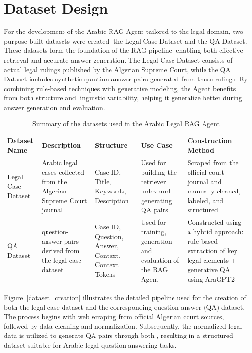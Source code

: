 \section{Dataset Design}
For the development of the Arabic RAG Agent tailored to the legal domain, two purpose-built datasets were created: the Legal Case Dataset and the QA Dataset. These datasets form the foundation of the RAG pipeline, enabling both effective retrieval and accurate answer generation. The Legal Case Dataset consists of actual legal rulings published by the Algerian Supreme Court, while the QA Dataset includes synthetic question-answer pairs generated from those rulings. By combining rule-based techniques with generative modeling, the Agent benefits from both structure and linguistic variability, helping it generalize better during answer generation and evaluation.
\begin{table}[h!]
	\centering
	\captionsetup{justification=centering}
	\renewcommand{\arraystretch}{1.4}
	\begin{tabularx}{\textwidth}{|>{\raggedright\arraybackslash}p{2.5cm}|>{\raggedright\arraybackslash}p{3.1cm}|>{\raggedright\arraybackslash}p{3cm}|>{\raggedright\arraybackslash}p{3.2cm}|>{\raggedright\arraybackslash}X|}
		\hline
		\textbf{Dataset Name} & \textbf{Description} & \textbf{Structure} & \textbf{Use Case} & \textbf{Construction Method} \\
		\hline
		Legal Case Dataset & 104 Arabic legal cases collected from the Algerian Supreme Court journal & Case ID, Title, Keywords, Description & Used for building the retriever index and generating QA pairs & Scraped from the official court journal and manually cleaned, labeled, and structured \\
		\hline
		QA Dataset & 512 question-answer pairs derived from the legal case dataset & Case ID, Question, Answer, Context, Context Tokens & Used for training, generation, and evaluation of the RAG Agent & Constructed using a hybrid approach: rule-based extraction of key legal elements + generative QA using AraGPT2 \\
		\hline
	\end{tabularx}
	\caption{Summary of the datasets used in the Arabic Legal RAG Agent}
\end{table}
Figure~\ref{dataset_creation} illustrates the detailed pipeline used for the creation of both the legal case dataset and the corresponding question-answer (QA) dataset. The process begins with web scraping from official Algerian court sources, followed by data cleaning and normalization. Subsequently, the normalized legal data is utilized to generate QA pairs through both , resulting in a structured dataset suitable for Arabic legal question answering tasks.
